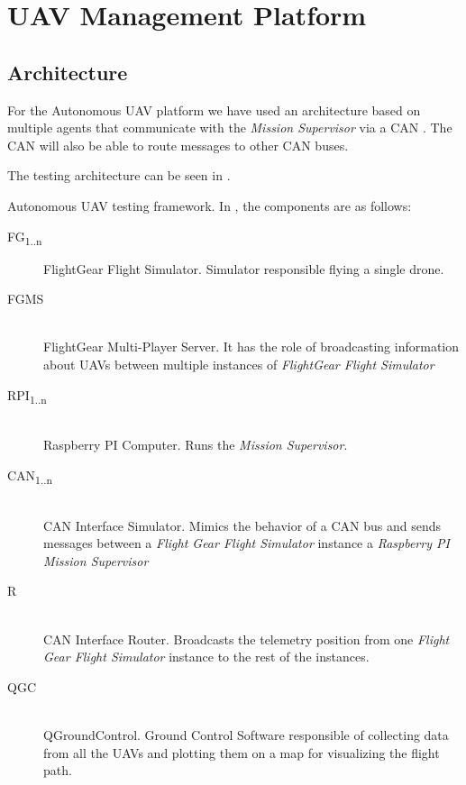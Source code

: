\chapter{UAV Management Platform}
\label{chapter:uav-management-framework}

\section{Architecture}
\label{sec:architecture}
For the Autonomous UAV platform we have used an architecture based on multiple
agents that communicate with the \textit{Mission Supervisor} via a CAN
. The CAN will also be able to route messages
to other CAN buses. 

The testing architecture can be seen in  .

{Autonomous UAV testing framework}.
\newpage
In , the components are as
follows:
\begin{description}
\item [FG\textsubscript{1..n}] FlightGear Flight Simulator. Simulator responsible
flying a single drone.
\item [FGMS] \hfill \\ FlightGear Multi-Player Server. It has the role of broadcasting
information about UAVs between multiple instances of \textit{FlightGear Flight Simulator}
\item [RPI\textsubscript{1..n}] \hfill \\Raspberry PI Computer. Runs the \textit{Mission Supervisor}.
\item [CAN\textsubscript{1..n}] \hfill \\ CAN Interface Simulator. Mimics the behavior of 
a CAN bus and sends messages between a \textit{Flight Gear Flight Simulator} 
instance a \textit{Raspberry PI Mission Supervisor}
\item [R] \hfill \\ CAN Interface Router. Broadcasts the telemetry position from one
\textit{Flight Gear Flight Simulator} instance to the rest of the instances.
\item [QGC] \hfill \\ QGroundControl. Ground Control Software responsible of collecting data
from all the UAVs and plotting them on a map for visualizing the flight path.
\end{description}

